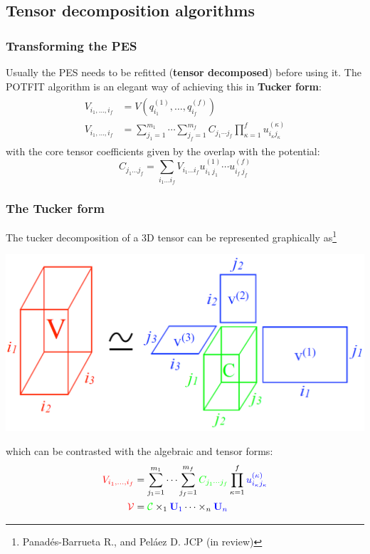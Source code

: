 \documentclass{beamer}
\begin{document}
\subsection{Tensor decomposition algorithms}\label{tdec}

\begin{frame}
  \frametitle{Transforming the PES}
  Usually the PES needs to be refitted (\textbf{tensor decomposed}) before using it. The POTFIT algorithm is an elegant way of achieving this in \textbf{Tucker form}:
  \begin{align}
    \label{potfit}
    \begin{split}
     V_{i_1,\ldots,i_f} &= V(q^{(1)}_{i_1},\ldots,q^{(f)}_{i_f}) \\
	V_{i_1,\ldots,i_f} &= \sum_{j_1=1}^{m_1} \cdots \sum_{j_f=1}^{m_f} C_{j_1 \cdots j_f}\prod_{\kappa=1}^f u_{i_{\kappa}j_{\kappa}}^{(\kappa)}
    \end{split}
  \end{align}
  with the core tensor coefficients given by the overlap with the potential:
\begin{equation}
  \label{core}
   C_{j_1\ldots j_f} = \sum_{i_1\ldots i_f} V_{i_1\ldots i_f} u^{(1)}_{i_1\ j_1} \cdots u^{(f)}_{i_f\ j_f}
\end{equation}
 
\end{frame}

\begin{frame}
  \frametitle{The Tucker form}
  The tucker decomposition of a 3D tensor can be represented graphically as\footnote{Panadés-Barrueta R., and Peláez D. JCP (in review)}
  \begin{center}
  \includegraphics[scale=.1]{tuck.pdf}
\end{center}
which can be contrasted with the algebraic and tensor forms:
\begin{align}
  \label{alg}
  \begin{split}
	\textcolor{red}{V_{i_1,\ldots,i_f}} &= \sum_{j_1=1}^{m_1} \cdots \sum_{j_f=1}^{m_f} \textcolor{green}{C_{j_1 \cdots j_f}}\prod_{\kappa=1}^f \textcolor{blue}{u_{i_{\kappa}j_{\kappa}}^{(\kappa)}}\\
	\textcolor{red}{\mathcal{V}} &= \textcolor{green}{\mathcal{C}} \times_1 \textcolor{blue}{\mathbf{U}_1} \cdots \times_n \textcolor{blue}{\mathbf{U}_n}
  \end{split}
\end{align}
  
\end{frame}
\end{document}
